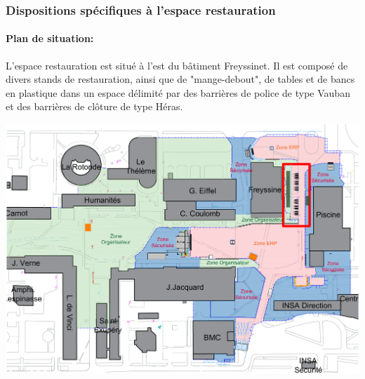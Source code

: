 \documentclass[hidelinks, paper=a4, fontsize=13pt]{report}
\begin{document}
\subsubsection{Dispositions spécifiques à l’espace restauration}

\paragraph{Plan de situation:}
L’espace restauration est situé à l'est du bâtiment Freyssinet. Il est composé de divers stands de restauration, ainsi que de "mange-debout", de tables et de bancs en plastique dans un espace délimité par des barrières  de police de type Vauban et des barrières de clôture de type Héras.

\begin{center}
	\includegraphics[width=.8\textwidth,keepaspectratio]{Exports/Plan_24h_44eme-Espace_Resto}

\end{center}
\end{document}
